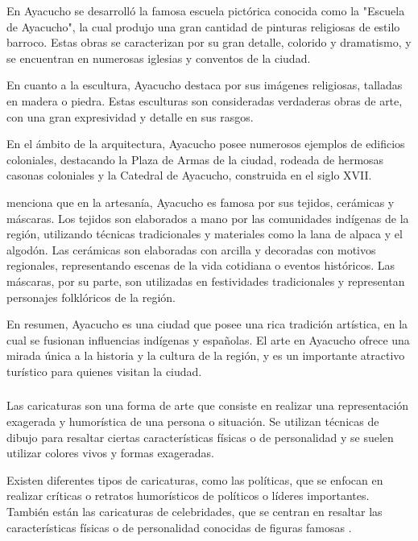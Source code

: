 \documentclass[12pt,a4paper]{article}
\begin{document}
En Ayacucho se desarrolló la famosa escuela pictórica conocida como la "Escuela de Ayacucho", la cual produjo una gran cantidad de pinturas religiosas de estilo barroco. Estas obras se caracterizan por su gran detalle, colorido y dramatismo, y se encuentran en numerosas iglesias y conventos de la ciudad. \cite{velasco_historia_2008} 

En cuanto a la escultura, Ayacucho destaca por sus imágenes religiosas, talladas en madera o piedra. Estas esculturas son consideradas verdaderas obras de arte, con una gran expresividad y detalle en sus rasgos.

En el ámbito de la arquitectura, Ayacucho posee numerosos ejemplos de edificios coloniales, destacando la Plaza de Armas de la ciudad, rodeada de hermosas casonas coloniales y la Catedral de Ayacucho, construida en el siglo XVII.

\cite{velasco_historia_2008} menciona que en la artesanía, Ayacucho es famosa por sus tejidos, cerámicas y máscaras. Los tejidos son elaborados a mano por las comunidades indígenas de la región, utilizando técnicas tradicionales y materiales como la lana de alpaca y el algodón. Las cerámicas son elaboradas con arcilla y decoradas con motivos regionales, representando escenas de la vida cotidiana o eventos históricos. Las máscaras, por su parte, son utilizadas en festividades tradicionales y representan personajes folklóricos de la región.

En resumen, Ayacucho es una ciudad que posee una rica tradición artística, en la cual se fusionan influencias indígenas y españolas. El arte en Ayacucho ofrece una mirada única a la historia y la cultura de la región, y es un importante atractivo turístico para quienes visitan la ciudad.

\subsubsection{\variablei}%

Las caricaturas son una forma de arte que consiste en realizar una representación exagerada y humorística de una persona o situación. Se utilizan técnicas de dibujo para resaltar ciertas características físicas o de personalidad y se suelen utilizar colores vivos y formas exageradas.

Existen diferentes tipos de caricaturas, como las políticas, que se enfocan en realizar críticas o retratos humorísticos de políticos o líderes importantes. También están las caricaturas de celebridades, que se centran en resaltar las características físicas o de personalidad conocidas de figuras famosas \cite{gray_caricaturas_2015}.
\end{document}
